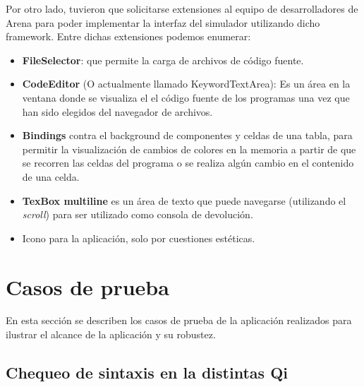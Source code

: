 Por otro lado, tuvieron que solicitarse extensiones al equipo de desarrolladores de Arena para poder implementar la interfaz del simulador utilizando dicho framework. Entre dichas extensiones podemos enumerar:

\begin{itemize}
\item \textbf{FileSelector}: que permite la carga de archivos de código fuente.
\item \textbf{CodeEditor} (O actualmente llamado KeywordTextArea): Es un área en la ventana donde se visualiza el el código fuente de los programas   una vez que han sido elegidos del navegador de archivos.
\item \textbf{Bindings} contra el background de componentes y celdas de una tabla, para permitir la visualización de cambios de colores en la memoria a partir de que se recorren las celdas del programa o se realiza algún cambio en el contenido de una celda.
\item \textbf{TexBox multiline} es un área de texto que puede navegarse (utilizando el \textit{scroll}) para ser utilizado como consola de devolución.
\item Icono para la aplicación, solo por cuestiones estéticas.
\end{itemize}

\section{Casos de prueba}

En esta sección se describen los casos de prueba de la aplicación realizados para ilustrar el alcance de la aplicación y su robustez.

\subsection{Chequeo de sintaxis en la distintas Qi}

